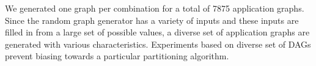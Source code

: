 We generated one graph per combination for a total of 7875 application graphs.
Since the random graph generator has a variety of inputs and these inputs
are filled in from a large set of possible values, a diverse set of application graphs are
generated with various characteristics. Experiments based on diverse set of DAGs
prevent biasing towards a particular partitioning algorithm.



